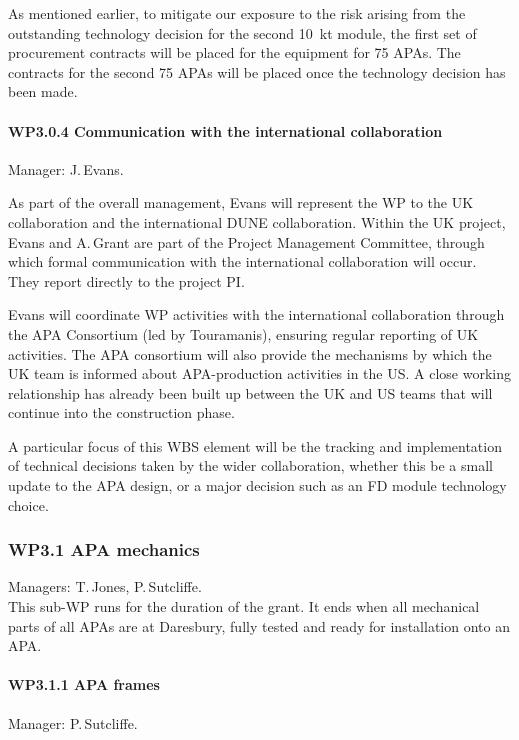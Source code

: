 As mentioned earlier, to mitigate our exposure to the risk arising from the outstanding technology decision for the second \SI{10}{\kilo\tonne} module, the first set of procurement contracts will be placed for the equipment for 75 APAs. The contracts for the second 75 APAs will be placed once the technology decision has been made.

\paragraph{WP3.0.4 Communication with the international collaboration}

Manager: J.\,Evans.

As part of the overall management, Evans will represent the WP to the UK collaboration and the international DUNE collaboration. Within the UK project, Evans and A.\,Grant are part of the Project Management Committee, through which formal communication with the international collaboration will occur. They report directly to the project PI. 

Evans will coordinate WP activities with the international collaboration through the APA Consortium (led by Touramanis), ensuring regular reporting of UK activities. The APA consortium will also provide the mechanisms by which the UK team is informed about APA-production activities in the US. A close working relationship has already been built up between the UK and US teams that will continue into the construction phase.

A particular focus of this WBS element will be the tracking and implementation of technical decisions taken by the wider collaboration, whether this be a small update to the APA design, or a major decision such as an FD module technology choice.

\subsubsection{WP3.1 APA mechanics}
Managers: T.\,Jones, P.\,Sutcliffe.\\
This sub-WP runs for the duration of the grant. It ends when all mechanical parts of all APAs are at Daresbury, fully tested and ready for installation onto an APA.

\paragraph{WP3.1.1 APA frames} Manager: P.\,Sutcliffe.


